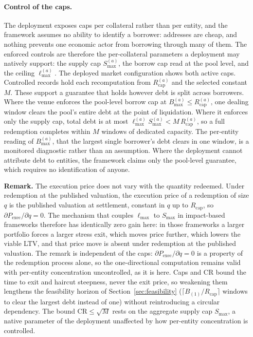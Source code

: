 \paragraph{Control of the caps.} The deployment exposes caps per collateral rather than per entity, and the framework assumes no ability to identify a borrower: addresses are cheap, and nothing prevents one economic actor from borrowing through many of them. The enforced controls are therefore the per-collateral parameters a deployment may natively support: the supply cap $S_{\max}^{(a)}$, the borrow cap read at the pool level, and the ceiling $\ell_{\max}^{(a)}$. The deployed market configuration shows both active caps. Controlled records hold each recomputation from $R_{\mathrm{cap}}^{(a)}$ and the selected constant $M$. These support a guarantee that holds however debt is split across borrowers. Where the venue enforces the pool-level borrow cap at $B_{\max}^{(a)}\le R_{\mathrm{cap}}^{(a)}$, one dealing window clears the pool's entire debt at the point of liquidation. Where it enforces only the supply cap, total debt is at most $\ell_{\max}^{(a)}S_{\max}^{(a)}<M\,R_{\mathrm{cap}}^{(a)}$, so a full redemption completes within $M$ windows of dedicated capacity. The per-entity reading of $B_{\max}^{(a)}$, that the largest single borrower's debt clears in one window, is a monitored diagnostic rather than an assumption. Where the deployment cannot attribute debt to entities, the framework claims only the pool-level guarantee, which requires no identification of anyone.

\textbf{Remark.} The execution price does not vary with the quantity redeemed. Under redemption at the published valuation, the execution price of a redemption of size $q$ is the published valuation at settlement, constant in $q$ up to $R_{\mathrm{cap}}$, so $\partial P_{\mathrm{exec}}/\partial q = 0$. The mechanism that couples $\ell_{\max}$ to $S_{\max}$ in impact-based frameworks therefore has identically zero gain here: in those frameworks a larger portfolio forces a larger stress exit, which moves price further, which lowers the viable LTV, and that price move is absent under redemption at the published valuation. The remark is independent of the caps: $\partial P_{\mathrm{exec}}/\partial q = 0$ is a property of the redemption process alone, so the one-directional computation remains valid with per-entity concentration uncontrolled, as it is here. Caps and $\mathrm{CR}$ bound the time to exit and haircut steepness, never the exit price, so weakening them lengthens the feasibility horizon of Section~\ref{sec:feasibility} ($\lceil B_{(1)}/R_{\mathrm{cap}}\rceil$ windows to clear the largest debt instead of one) without reintroducing a circular dependency. The bound $\mathrm{CR}\le\sqrt{M}$ rests on the aggregate supply cap $S_{\max}$, a native parameter of the deployment unaffected by how per-entity concentration is controlled.

